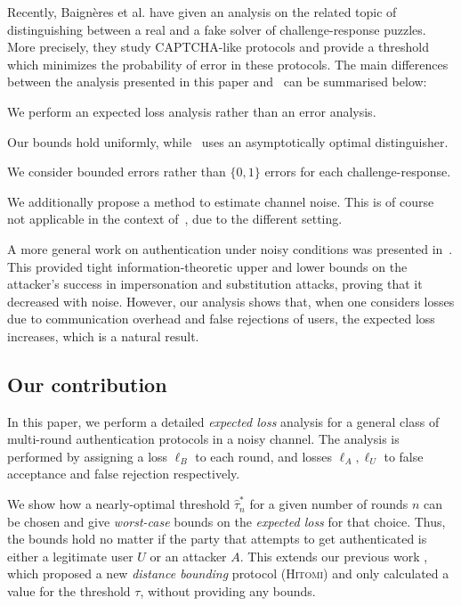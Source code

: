 \documentclass[a4paper]{article}
\newcommand \thr {\tau}
\newcommand \hthr {\hat{\thr}_n^*}
\newcommand \LA {\ell_A}
\newcommand \LU {\ell_U}
\newcommand \LB {\ell_B}
\newcommand \Hitomi {\textsc{Hitomi}}
\theoremstyle{plain} \newtheorem{remark}{Remark}
\theoremstyle{plain} \newtheorem{definition}{Definition}
\theoremstyle{plain} \newtheorem{example}{Example}
\theoremstyle{plain} \newtheorem{assumption}{Assumption}
\theoremstyle{plain} \newtheorem{conjecture}{Conjecture}
\theoremstyle{plain} \newtheorem{theorem}{Theorem}
\theoremstyle{plain} \newtheorem{proposition}{Proposition}
\theoremstyle{plain} \newtheorem{lemma}{Lemma}
\theoremstyle{plain} \newtheorem{corollary}{Corollary}
\begin{document}
Recently, Baign\`{e}res et al. \cite{ProvSec2010} have given an
analysis on the related topic of distinguishing between a real and a
fake solver of challenge-response puzzles. More precisely, they study
CAPTCHA-like protocols and provide a threshold which minimizes the
probability of error in these protocols.  The main differences between
the analysis presented in this paper and~\cite{ProvSec2010} can be
summarised below: \begin{inparaenum}[(a)]
\item We perform an expected loss analysis rather than an error
  analysis.
\item Our bounds hold uniformly, while~\cite{ProvSec2010} uses an asymptotically optimal distinguisher.
\item We consider bounded errors rather than $\{0,1\}$ errors for each
  challenge-response.
\item We additionally propose a method to estimate channel noise.
  This is of course not applicable in the context
  of~\cite{ProvSec2010}, due to the different setting.
\end{inparaenum}

A more general work on authentication under noisy conditions was
presented in~\cite{lai}.  This provided tight information-theoretic
upper and lower bounds on the attacker's success in impersonation and
substitution attacks, proving that it decreased with noise.  However,
our analysis shows that, when one considers losses due to
communication overhead and false rejections of users, the expected
loss increases, which is a natural result.

\subsection{Our contribution}
In this paper, we perform a detailed \textit{expected loss} analysis
for a general class of multi-round authentication protocols in a noisy
channel. The analysis is performed by assigning a loss $\LB$ to each round,
and losses $\LA, \LU$ to false acceptance and false rejection respectively.

We show how a nearly-optimal threshold $\hthr$ for a given number of
rounds $n$ can be chosen and give {\em worst-case} bounds on the
\textit{expected loss} for that choice.  Thus, the bounds hold no
matter if the party that attempts to get authenticated is either a
legitimate user $U$ or an attacker $A$. This extends our previous work
\cite{sheddingLight}, which proposed a new \textit{distance bounding}
protocol ({\Hitomi}) and only calculated a value for the threshold
$\tau$, without providing any bounds.
\end{document}
